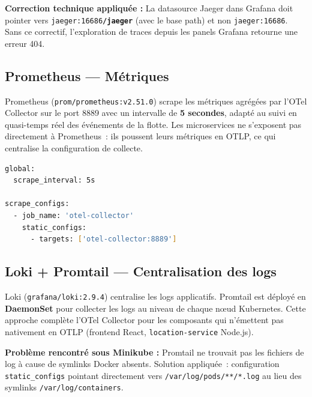 \documentclass[12pt,a4paper]{article}
\begin{document}
\begin{infobox}
\textbf{Correction technique appliqu\'{e}e :} La datasource Jaeger dans Grafana
doit pointer vers \texttt{jaeger:16686\textbf{/jaeger}} (avec le base path) et
non \texttt{jaeger:16686}. Sans ce correctif, l'exploration de traces
depuis les panels Grafana retourne une erreur 404.
\end{infobox}

\subsection{Prometheus --- M\'{e}triques}

Prometheus (\texttt{prom/prometheus:v2.51.0}) scrape les m\'{e}triques agr\'{e}g\'{e}es
par l'OTel Collector sur le port 8889 avec un intervalle de \textbf{5 secondes},
adapt\'{e} au suivi en quasi-temps r\'{e}el des \'{e}v\'{e}nements de la flotte. Les
microservices ne s'exposent pas directement \`{a} Prometheus~: ils poussent
leurs m\'{e}triques en OTLP, ce qui centralise la configuration de collecte.

\begin{lstlisting}[language=bash, caption=Configuration du scraping Prometheus]
global:
  scrape_interval: 5s

scrape_configs:
  - job_name: 'otel-collector'
    static_configs:
      - targets: ['otel-collector:8889']
\end{lstlisting}

\subsection{Loki + Promtail --- Centralisation des logs}

Loki (\texttt{grafana/loki:2.9.4}) centralise les logs applicatifs. Promtail
est d\'{e}ploy\'{e} en \textbf{DaemonSet} pour collecter les logs au niveau de chaque
n\oe{}ud Kubernetes. Cette approche compl\`{e}te l'OTel Collector pour les
composants qui n'\'{e}mettent pas nativement en OTLP (frontend React,
\texttt{location-service} Node.js).

\begin{infobox}
\textbf{Probl\`{e}me rencontr\'{e} sous Minikube :} Promtail ne trouvait pas les
fichiers de log \`{a} cause de symlinks Docker absents. Solution appliqu\'{e}e~:
configuration \texttt{static\_configs} pointant directement vers
\texttt{/var/log/pods/**/*.log} au lieu des symlinks \texttt{/var/log/containers}.
\end{infobox}
\end{document}
